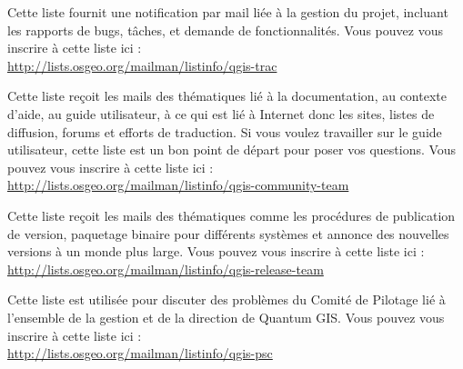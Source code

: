 Cette liste fournit une notification par mail li\'ee \`a la gestion du projet,
incluant les rapports de bugs, t\^aches, et demande de fonctionnalit\'es. Vous
pouvez vous inscrire \`a cette liste ici :\\
\url{http://lists.osgeo.org/mailman/listinfo/qgis-trac}

Cette liste re\c{c}oit les mails des th\'ematiques li\'e \`a la documentation, au
contexte d'aide, au guide utilisateur, \`a ce qui est li\'e \`a Internet donc les
sites, listes de diffusion, forums et efforts de traduction. Si vous voulez
travailler sur le guide utilisateur, cette liste est un bon point de d\'epart
pour poser vos questions. Vous pouvez vous inscrire \`a cette liste ici :\\
\url{http://lists.osgeo.org/mailman/listinfo/qgis-community-team}

Cette liste re\c{c}oit les mails des th\'ematiques comme les proc\'edures de
publication de version, paquetage binaire pour diff\'erents syst\`emes et annonce
des nouvelles versions \`a un monde plus large. Vous pouvez vous inscrire \`a cette
liste ici :\\
\url{http://lists.osgeo.org/mailman/listinfo/qgis-release-team}

Cette liste est utilis\'ee pour discuter des probl\`emes du Comit\'e de Pilotage li\'e \`a
l'ensemble de la gestion et de la direction de Quantum GIS. Vous pouvez vous
inscrire \`a cette liste ici :\\
\url{http://lists.osgeo.org/mailman/listinfo/qgis-psc}

